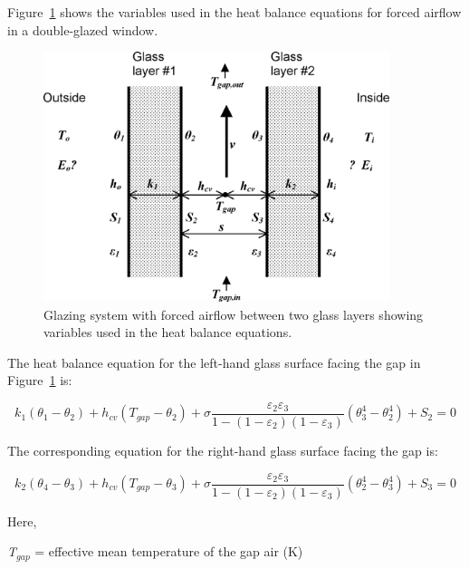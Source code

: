 Figure~\ref{fig:glazing-system-with-forced-airflow-between} shows the variables used in the heat balance equations for forced airflow in a double-glazed window.

\begin{figure}[hbtp] %
\centering
\includegraphics[width=0.9\textwidth, height=0.9\textheight, keepaspectratio=true]{media/image1749.png}
\caption{Glazing system with forced airflow between two glass layers showing variables used in the heat balance equations. \protect \label{fig:glazing-system-with-forced-airflow-between}}
\end{figure}

The heat balance equation for the left-hand glass surface facing the gap in Figure~\ref{fig:glazing-system-with-forced-airflow-between} is:

\begin{equation}
{k_1}({\theta_1} - {\theta_2}) + {h_{cv}}({T_{gap}} - {\theta_2}) + \sigma \frac{{{\varepsilon_2}{\varepsilon_3}}}{{1 - (1 - {\varepsilon_2})(1 - {\varepsilon_3})}}\left( {\theta_3^4 - \theta_2^4} \right) + {S_2} = 0
\end{equation}

The corresponding equation for the right-hand glass surface facing the gap is:

\begin{equation}
{k_2}({\theta_4} - {\theta_3}) + {h_{cv}}({T_{gap}} - {\theta_3}) + \sigma \frac{{{\varepsilon_2}{\varepsilon_3}}}{{1 - (1 - {\varepsilon_2})(1 - {\varepsilon_3})}}\left( {\theta_2^4 - \theta_3^4} \right) + {S_3} = 0
\end{equation}

Here,

\emph{T\(_{gap}\)} = effective mean temperature of the gap air (K)

